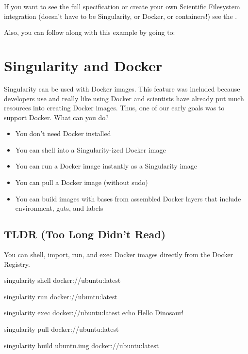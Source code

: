 \documentclass[letterpaper,10pt,english]{sphinxmanual}
\begin{document}
If you want to see the full specification or create your own
Scientific Filesystem integration (doesn’t have to be Singularity, or
Docker, or containers!) see the .

Also, you can follow along with this example by going to: 


\chapter{Singularity and Docker}
\label{\detokenize{singularity_and_docker:singularity-and-docker}}\label{\detokenize{singularity_and_docker:id1}}\label{\detokenize{singularity_and_docker::doc}}
Singularity can be used with Docker images. This feature was included because
developers use and really like using Docker and scientists have already
put much resources into creating Docker images. Thus, one of our early goals was to support Docker. What can you do?
\begin{itemize}
\item {} 
You don’t need Docker installed

\item {} 
You can shell into a Singularity-ized Docker image

\item {} 
You can run a Docker image instantly as a Singularity image

\item {} 
You can pull a Docker image (without sudo)

\item {} 
You can build images with bases from assembled Docker layers that
include environment, guts, and labels

\end{itemize}


\section{TLDR (Too Long Didn’t Read)}
\label{\detokenize{singularity_and_docker:tldr-too-long-didnt-read}}
You can shell, import, run, and exec Docker images directly from the Docker Registry.

%
\begin{sphinxVerbatim}[commandchars=\\\{\}]
singularity shell docker://ubuntu:latest

singularity run docker://ubuntu:latest

singularity exec docker://ubuntu:latest echo \PYGZdq{}Hello Dinosaur!\PYGZdq{}


singularity pull docker://ubuntu:latest

singularity build ubuntu.img docker://ubuntu:latest
\end{sphinxVerbatim}
\end{document}
